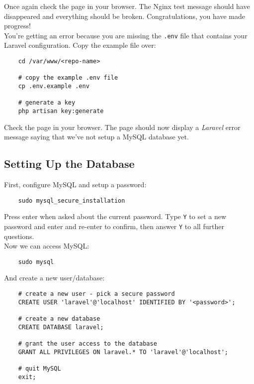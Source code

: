 Once again check the page in your browser. The Nginx test message should have disappeared and everything should be broken. Congratulations, you have made progress!
\\

You're getting an error because you are missing the \texttt{.env} file that contains your Laravel configuration. Copy the example file over:

\begin{verbatim}
    cd /var/www/<repo-name>

    # copy the example .env file
    cp .env.example .env

    # generate a key
    php artisan key:generate
\end{verbatim}

Check the page in your browser. The page should now display a \textit{Laravel} error message saying that we've not setup a MySQL database yet.


\subsection{Setting Up the Database}

First, configure MySQL and setup a password:

\begin{verbatim}
    sudo mysql_secure_installation
\end{verbatim}

Press enter when asked about the current password. Type \texttt{Y} to set a new password and enter and re-enter to confirm, then answer \texttt{Y} to all further questions.
\\

Now we can access MySQL:

\begin{verbatim}
    sudo mysql
\end{verbatim}

And create a new user/database:

\begin{verbatim}
    # create a new user - pick a secure password
    CREATE USER 'laravel'@'localhost' IDENTIFIED BY '<password>';

    # create a new database
    CREATE DATABASE laravel;

    # grant the user access to the database
    GRANT ALL PRIVILEGES ON laravel.* TO 'laravel'@'localhost';

    # quit MySQL
    exit;
\end{verbatim}

